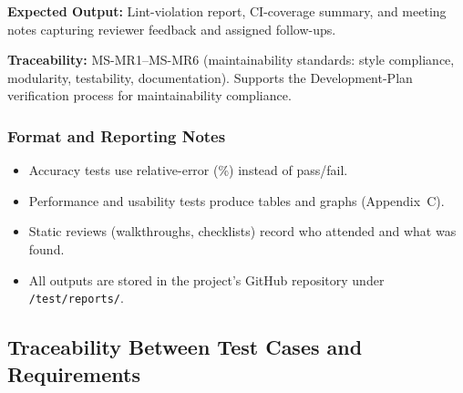\documentclass[12pt, titlepage]{article}
\begin{document}
\textbf{Expected Output:} Lint-violation report, CI-coverage summary, and meeting notes capturing reviewer feedback and assigned follow-ups.

\textbf{Traceability:} MS-MR1--MS-MR6 (maintainability standards: style compliance, modularity, testability, documentation). Supports the Development-Plan verification process for maintainability compliance.

\subsubsection*{Format and Reporting Notes}
\begin{itemize}
  \item Accuracy tests use relative-error (\%) instead of pass/fail.
  \item Performance and usability tests produce tables and graphs (Appendix~C).
  \item Static reviews (walkthroughs, checklists) record who attended and what was found.
  \item All outputs are stored in the project’s GitHub repository under \texttt{/test/reports/}.
\end{itemize}

\subsection{Traceability Between Test Cases and Requirements}
\label{subsec:traceability}
\end{document}
